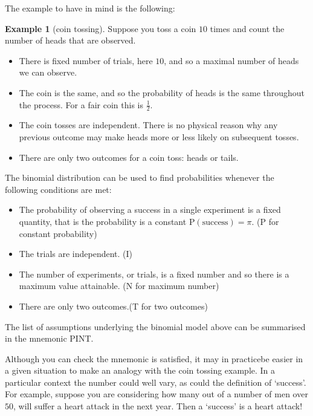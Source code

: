 \documentclass[
]{book}
\theoremstyle{definition}
\theoremstyle{definition}
\newtheorem{example}{Example}[chapter]
\theoremstyle{definition}
\theoremstyle{definition}
\theoremstyle{remark}
\begin{document}
The example to have in mind is the following:

\begin{example}[coin tossing]

Suppose you toss a coin \(10\) times and count the number of heads that are observed.

\begin{itemize}
\item
  There is fixed number of trials, here \(10\), and so a maximal number of heads we can observe.
\item
  The coin is the same, and so the probability of heads is the same throughout the process. For a fair coin this is \(\frac{1}{2}\).
\item
  The coin tosses are independent. There is no physical reason why any previous outcome may make heads more or less likely on subsequent tosses.
\item
  There are only two outcomes for a coin toss: heads or tails.
\end{itemize}

\end{example}

The binomial distribution can be used to find probabilities whenever the following conditions are met:

\begin{itemize}
\item
  The probability of observing a success in a single experiment is a fixed quantity, that is the probability is a constant \(\text{P}(\text{success}) = \pi\). (P for constant probability)
\item
  The trials are independent. (I)
\item
  The number of experiments, or trials, is a fixed number and so there is a maximum value attainable. (N for maximum number)
\item
  There are only two outcomes.(T for two outcomes)
\end{itemize}

The list of assumptions underlying the binomial model above can be summarised in the mnemonic PINT.

Although you can check the mnemonic is satisfied, it may in practicebe easier in a given situation to make an analogy with the coin tossing example. In a particular context the number could well vary, as could the definition of `success'. For example, suppose you are considering how many out of a number of men over \(50\), will suffer a heart attack in the next year. Then a `success' is a heart attack!
\end{document}
